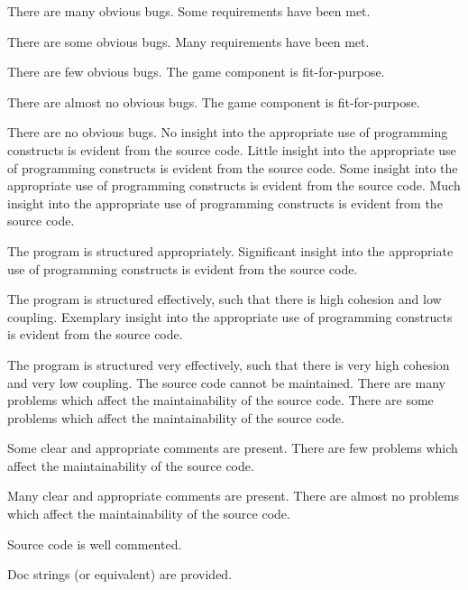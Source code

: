 \documentclass{../fal_assignment}
\begin{document}
\begin{markingrubric}
        \par 		There are many obvious bugs.
        \grade 		Some requirements have been met.
        \par 		There are some obvious bugs.
        \grade 		Many requirements have been met.
        \par 		There are few obvious bugs.
        \grade 		The game component is fit-for-purpose.
        \par 		There are almost no obvious bugs.
        \grade 		The game component is fit-for-purpose.
        \par 		There are no obvious bugs.
%
        \grade\fail 	No insight into the appropriate use of programming constructs is evident from the source code.
        \grade 		Little insight into the appropriate use of programming constructs is evident from the source code.
        \grade 		Some insight into the appropriate use of programming constructs is evident from the source code.
        \grade 		Much insight into the appropriate use of programming constructs is evident from the source code.
        \par 		The program is structured appropriately.
        \grade 		Significant insight into the appropriate use of programming constructs is evident from the source code.
        \par 		The program is structured effectively, such that there is high cohesion and low coupling.
        \grade 		Exemplary insight into the appropriate use of programming constructs is evident from the source code.
        \par 		The program is structured very effectively, such that there is very high cohesion and very low coupling.
%
        \grade\fail 	The source code cannot be maintained.
        \grade 		There are many problems which affect the maintainability of the source code.
        \grade 		There are some problems which affect the maintainability of the source code. 
        \par 		Some clear and appropriate comments are present.
        \grade 		There are few problems which affect the maintainability of the source code. 
        \par 		Many clear and appropriate comments are present.
        \grade 		There are almost no problems which affect the maintainability of the source code. 
        \par 		Source code is well commented.
        \par 		Doc strings (or equivalent) are provided.       

\end{markingrubric}
\end{document}

